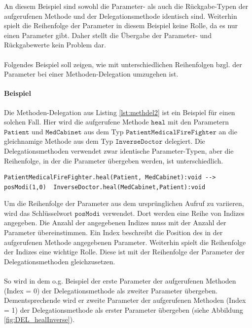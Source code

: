 \documentclass[a4paper,12pt]{article}
\begin{document}
\noindent
An diesem Beispiel sind sowohl die Parameter- als auch die Rückgabe-Typen der aufgerufenen Methode und der Delegationsmethode identisch sind. Weiterhin spielt die Reihenfolge der Parameter in diesem Beispiel keine Rolle, da es nur einen Parameter gibt. Daher stellt die Übergabe der Parameter- und Rückgabewerte kein Problem dar.\\\\
Folgendes Beispiel soll zeigen, wie mit unterschiedlichen Reihenfolgen bzgl. der Parameter bei einer Methoden-Delegation umzugehen ist.
\paragraph{Beispiel} Die Methoden-Delegation aus Listing \ref{lst:methdel2} ist ein Beispiel für einen solchen Fall. Hier wird die aufgerufene Methode $\texttt{heal}$ mit den Parametern $\texttt{Patient}$ und $\texttt{MedCabinet}$ aus dem Typ $\texttt{PatientMedicalFireFighter}$ an die gleichnamige Methode aus dem Typ $\texttt{InverseDoctor}$ delegiert. Die Delegationsmethoden verwendet zwar identische Parameter-Typen, aber die Reihenfolge, in der die Parameter übergeben werden, ist unterschiedlich.
\begin{lstlisting}[style = dsl, caption = Methoden-Delegation mit Parametern in unterschiedlicher Reihenfolge, captionpos = b]
	PatientMedicalFireFighter.heal(Patient, MedCabinet):void --> posModi(1,0)  InverseDoctor.heal(MedCabinet,Patient):void
\end{lstlisting}\label{lst:methdel2}
\noindent
Um die Reihenfolge der Parameter aus dem ursprünglichen Aufruf zu variieren, wird das Schlüsselwort $\texttt{posModi}$ verwendet. Dort werden eine Reihe von Indizes angegeben. Die Anzahl der angegebenen Indizes muss mit der Anzahl der Parameter übereinstimmen. Ein Index beschreibt die Position des in der aufgerufenen Methode angegebenen Parameter. Weiterhin spielt die Reihenfolge der Indizes eine wichtige Rolle. Diese ist mit der Reihenfolge der Parameter der Delegationsmethoden gleichzusetzen.\\\\
So wird in dem o.g. Beispiel der erste Parameter der aufgerufenen Methoden (Index = 0) der Delegationsmethode als zweiter Parameter übergeben. Dementsprechende wird er zweite Parameter der aufgerufenen Methoden (Index = 1) der Delegationsmethode als erster Parameter übergeben (siehe Abbildung \ref{fig:DEL_healInverse}). 
\end{document}

